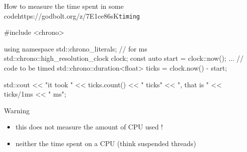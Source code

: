 \begin{frame}[fragile]
  \begin{exampleblockGB}{How to measure the time spent in some code}{https://godbolt.org/z/7E1ce86sK}{\texttt{timing}}
    \small
    \begin{cppcode*}{}
      #include <chrono>

      using namespace std::chrono_literals; // for ms
      std::chrono::high_resolution_clock clock;
      const auto start = clock::now();
      ... // code to be timed
      std::chrono::duration<float> ticks = clock.now() - start;

      std::cout << "it took " << ticks.count() << " ticks"
                << ", that is " << ticks/1ms << " ms\n";
    \end{cppcode*}
  \end{exampleblockGB}
  \pause
  \begin{alertblock}{Warning}
    \begin{itemize}
    \item this does not measure the amount of CPU used !
    \item neither the time spent on a CPU (think suspended threads)
    \end{itemize}
  \end{alertblock}
\end{frame}
